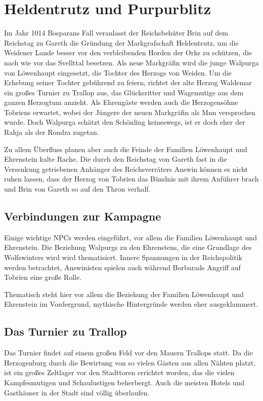 \section{Heldentrutz und Purpurblitz}

Im Jahr 1014 Bosparans Fall veranlasst der Reichsbehüter Brin auf dem Reichstag zu Gareth die Gründung der Markgrafschaft Heldentrutz, um die Weidener Lande besser vor den verbleibenden Horden der Orks zu schützen, die nach wie vor das Svellttal besetzen. Als neue Markgräfin wird die junge Walpurga von Löwenhaupt eingesetzt, die Tochter des Herzogs von Weiden.  Um die Erhebung seiner Tochter gebührend zu feiern, richtet der alte Herzog Waldemar ein großes Turnier zu Trallop aus, das Glücksritter und Wagemutige aus dem ganzen Herzogtum anzieht. Als Ehrengäste werden auch die Herzogensöhne Tobriens erwartet, wobei der Jüngere der neuen Markgräfin als Mnn versprochen wurde. Doch Walpurga schätzt den Schönling keineswegs, ist er doch eher der Rahja als der Rondra zugetan.

Zu allem Überfluss planen aber auch die Feinde der Familien Löwenhaupt und Ehrenstein kalte Rache. Die durch den Reichstag von Gareth fast in die Versenkung getriebenen Anhänger des Reichsverräters Answin können es nicht ruhen lassen, dass der Herzog von Tobrien das Bündnis mit ihrem Anführer brach und Brin von Gareth so auf den Thron verhalf.

\subsection{Verbindungen zur Kampagne}
Einige wichtige NPCs werden eingeführt, vor allem die Familien Löwenhaupt und Ehrenstein. Die Beziehung Walpurgs zu den Ehrenstens, die eine Grundlage des Wolfswinters wird wird thematisiert. Innere Spannungen in der Reichspolitik werden betrachtet, Answinisten spielen auch während Borbarads Angriff auf Tobrien eine große Rolle.

Thematisch steht hier vor allem die Beziehung der Familien Löwenhaupt und Ehrenstein im Vordergrund, mythische Hintergründe werden eher ausgeklammert.

\subsection{Das Turnier zu Trallop}

Das Turnier findet auf einem großen Feld vor den Mauern Trallops statt. Da die Herzogenburg durch die Bewirtung von so vielen Gästen aus allen Nähten platzt, ist ein großes Zeltlager vor den Stadttoren errichtet worden, das die vielen Kampfesmutigen und Schaulustigen beherbergt. Auch die meisten Hotels und Gasthäuser in der Stadt sind völlig überlaufen.

